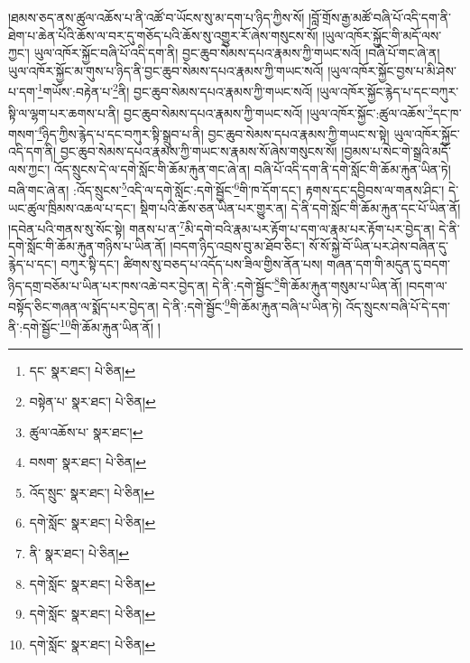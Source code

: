 །ཐམས་ཅད་ནས་ཚུལ་འཆོས་པ་ནི་འཚོ་བ་ཡོངས་སུ་མ་དག་པ་ཉིད་ཀྱིས་སོ། །བློ་གྲོས་རྒྱ་མཚོ་བཞི་པོ་འདི་དག་ནི་ཐེག་པ་ཆེན་པོའི་ཆོས་ལ་བར་དུ་གཅོད་པའི་ཆོས་སུ་འགྱུར་རོ་ཞེས་གསུངས་སོ། །ཡུལ་འཁོར་སྐྱོང་གི་མདོ་ལས་ཀྱང་། ཡུལ་འཁོར་སྐྱོང་བཞི་པོ་འདི་དག་ནི། བྱང་ཆུབ་སེམས་དཔའ་རྣམས་ཀྱི་གཡང་སའོ། །བཞི་པོ་གང་ཞེ་ན། ཡུལ་འཁོར་སྐྱོང་མ་གུས་པ་ཉིད་ནི་བྱང་ཆུབ་སེམས་དཔའ་རྣམས་ཀྱི་གཡང་སའོ། །ཡུལ་འཁོར་སྐྱོང་བྱས་པ་མི་ཤེས་པ་དག་\footnote{དང་  སྣར་ཐང་།  པེ་ཅིན། }གཡོས་:བརྟེན་པ་\footnote{བསྟེན་པ་  སྣར་ཐང་།  པེ་ཅིན། }ནི། བྱང་ཆུབ་སེམས་དཔའ་རྣམས་ཀྱི་གཡང་སའོ། །ཡུལ་འཁོར་སྐྱོང་རྙེད་པ་དང་བཀུར་སྟི་ལ་ལྷག་པར་ཆགས་པ་ནི། བྱང་ཆུབ་སེམས་དཔའ་རྣམས་ཀྱི་གཡང་སའོ། །ཡུལ་འཁོར་སྐྱོང་:ཚུལ་འཆོས་\footnote{ཚུལ་འཆོས་པ་  སྣར་ཐང་། }དང་ཁ་གསག་\footnote{བསག་  སྣར་ཐང་།  པེ་ཅིན། }ཉིད་ཀྱིས་རྙེད་པ་དང་བཀུར་སྟི་སྒྲུབ་པ་ནི། བྱང་ཆུབ་སེམས་དཔའ་རྣམས་ཀྱི་གཡང་ས་སྟེ། ཡུལ་འཁོར་སྐྱོང་འདི་དག་ནི། བྱང་ཆུབ་སེམས་དཔའ་རྣམས་ཀྱི་གཡང་ས་རྣམས་སོ་ཞེས་གསུངས་སོ། །བྱམས་པ་སེང་གེ་སྒྲའི་མདོ་ལས་ཀྱང་། འོད་སྲུངས་དེ་ལ་དགེ་སློང་གི་ཆོམ་རྐུན་གང་ཞེ་ན། བཞི་པོ་འདི་དག་ནི་དགེ་སློང་གི་ཆོམ་རྐུན་ཡིན་ཏེ། བཞི་གང་ཞེ་ན། :འོད་སྲུངས་\footnote{འོད་སྲུང་  སྣར་ཐང་།  པེ་ཅིན། }འདི་ལ་དགེ་སློང་:དགེ་སྦྱོང་\footnote{དགེ་སློང་  སྣར་ཐང་།  པེ་ཅིན། }གི་ཁ་དོག་དང་། རྟགས་དང་དབྱིབས་ལ་གནས་ཤིང་། དེ་ཡང་ཚུལ་ཁྲིམས་འཆལ་པ་དང་། སྡིག་པའི་ཆོས་ཅན་ཡིན་པར་གྱུར་ན། དེ་ནི་དགེ་སློང་གི་ཆོམ་རྐུན་དང་པོ་ཡིན་ནོ། །དབེན་པའི་གནས་སུ་སོང་སྟེ། གནས་པ་ན་\footnote{ནི་  སྣར་ཐང་།  པེ་ཅིན། }མི་དགེ་བའི་རྣམ་པར་རྟོག་པ་དག་ལ་རྣམ་པར་རྟོག་པར་བྱེད་ན། དེ་ནི་དགེ་སློང་གི་ཆོམ་རྐུན་གཉིས་པ་ཡིན་ནོ། །བདག་ཉིད་འབྲས་བུ་མ་ཐོབ་ཅིང་། སོ་སོ་སྐྱེ་བོ་ཡིན་པར་ཤེས་བཞིན་དུ་རྙེད་པ་དང་། བཀུར་སྟི་དང་། ཚིགས་སུ་བཅད་པ་འདོད་པས་ཟིལ་གྱིས་ནོན་པས། གཞན་དག་གི་མདུན་དུ་བདག་ཉིད་དགྲ་བཅོམ་པ་ཡིན་པར་ཁས་འཆེ་བར་བྱེད་ན། དེ་ནི་:དགེ་སྦྱོང་\footnote{དགེ་སློང་  སྣར་ཐང་།  པེ་ཅིན། }གི་ཆོམ་རྐུན་གསུམ་པ་ཡིན་ནོ། །བདག་ལ་བསྟོད་ཅིང་གཞན་ལ་སྨོད་པར་བྱེད་ན། དེ་ནི་:དགེ་སྦྱོང་\footnote{དགེ་སློང་  སྣར་ཐང་།  པེ་ཅིན། }གི་ཆོམ་རྐུན་བཞི་པ་ཡིན་ཏེ། འོད་སྲུངས་བཞི་པོ་དེ་དག་ནི་:དགེ་སྦྱོང་\footnote{དགེ་སློང་  སྣར་ཐང་།  པེ་ཅིན། }གི་ཆོམ་རྐུན་ཡིན་ནོ། །
